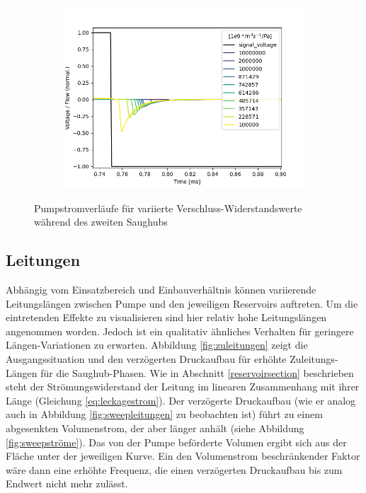 \documentclass[fontsize=12pt, a4paper]{scrartcl}
\begin{document}
\begin{figure}[H]
	\centering
	\begin{subfigure}[H]{0.48\textwidth}
		\includegraphics[width=\textwidth, valign=t]{bilder/leakage/leakage_in_branch_multiweep_flow.png}
	\end{subfigure}
    \caption{Pumpstromverläufe für variierte Verschluss-Widerstandswerte während des zweiten Saughubs}
    \label{fig:leckagestrom}
\end{figure}

\subsection{Leitungen}

Abhängig vom Einsatzbereich und Einbauverhältnis können variierende Leitungslängen zwischen Pumpe und den jeweiligen Reservoirs auftreten. Um die eintretenden Effekte zu visualisieren sind hier relativ hohe Leitungslängen angenommen worden. Jedoch ist ein qualitativ ähnliches Verhalten für geringere Längen-Variationen zu erwarten. Abbildung \ref{fig:zuleitungen} zeigt die Ausgangssituation und den verzögerten Druckaufbau für erhöhte Zuleitungs-Längen für die Saughub-Phasen. Wie in Abschnitt \ref{reservoirsection} beschrieben steht der Strömungswiderstand der Leitung im linearen Zusammenhang mit ihrer Länge (Gleichung \ref{eq:leckagestrom}). Der verzögerte Druckaufbau (wie er analog auch in Abbildung \ref{fig:sweepleitungen} zu beobachten ist) führt zu einem abgesenkten Volumenstrom, der aber länger anhält (siehe Abbildung \ref{fig:sweepströme}). Das von der Pumpe beförderte Volumen ergibt sich aus der Fläche unter der jeweiligen Kurve. Ein den Volumenstrom beschränkender Faktor wäre dann eine erhöhte Frequenz, die einen verzögerten Druckaufbau bis zum Endwert nicht mehr zulässt.
\end{document}
